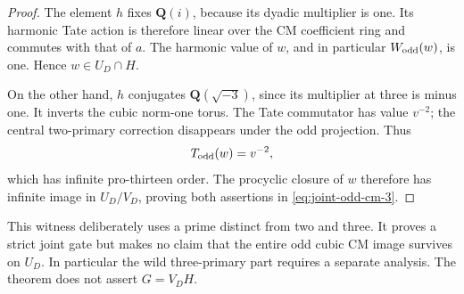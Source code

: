 \begin{proof}
The element \(h\) fixes \(\mathbf Q(i)\), because its
dyadic multiplier is one. Its harmonic Tate action
is therefore linear over the CM coefficient ring and
commutes with that of \(a\). The harmonic value of \(w\),
and in particular \(W_{\rm odd}(w)\), is one.
Hence \(w\in U_D\cap H\).

On the other hand, \(h\) conjugates
\(\mathbf Q(\sqrt{-3})\), since its multiplier at three
is minus one. It inverts the cubic norm-one torus.
The Tate commutator has value \(v^{-2}\);
the central two-primary correction disappears under the
odd projection. Thus
\[
                         T_{\rm odd}(w)=v^{-2},
\]
which has infinite pro-thirteen order.
The procyclic closure of \(w\) therefore has infinite
image in \(U_D/V_D\), proving both assertions in \eqref{eq:joint-odd-cm-3}.
\end{proof}

\begin{remark}
This witness deliberately uses a prime distinct from two
and three. It proves a strict joint gate but makes no claim
that the entire odd cubic CM image survives on \(U_D\).
In particular the wild three-primary part requires a
separate analysis. The theorem does not assert \(G=V_DH\).
\end{remark}

